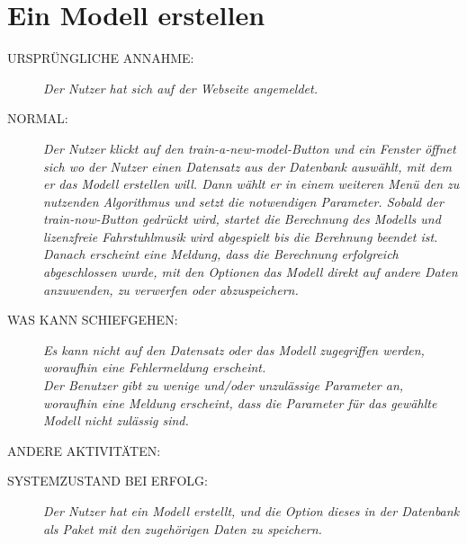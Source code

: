 \section{Ein Modell erstellen}
\begin{description}  
 \item [URSPRÜNGLICHE ANNAHME:]
    \textit{Der Nutzer hat sich auf der Webseite angemeldet.}
  \item [NORMAL:]
    \textit{Der Nutzer klickt auf den train-a-new-model-Button und ein Fenster öffnet sich wo der Nutzer einen Datensatz aus der Datenbank auswählt, mit dem er das Modell erstellen will. Dann wählt er in einem weiteren Menü den zu nutzenden Algorithmus und setzt die notwendigen Parameter. Sobald der train-now-Button gedrückt wird, startet die Berechnung des Modells und lizenzfreie Fahrstuhlmusik wird abgespielt bis die Berehnung beendet ist. Danach erscheint eine Meldung, dass die Berechnung erfolgreich abgeschlossen wurde, mit den Optionen das Modell direkt auf andere Daten anzuwenden, zu verwerfen oder abzuspeichern.}
  \item [WAS KANN SCHIEFGEHEN:]
    \textit{Es kann nicht auf den Datensatz oder das Modell zugegriffen werden, woraufhin eine Fehlermeldung erscheint.\\
Der Benutzer gibt zu wenige und/oder unzulässige Parameter an, woraufhin eine Meldung erscheint, dass die Parameter für das gewählte Modell nicht zulässig sind.
}
  \item [ANDERE AKTIVITÄTEN:]
    \textit{}
  \item [SYSTEMZUSTAND BEI ERFOLG:]
    \textit{Der Nutzer hat ein Modell erstellt, und die Option dieses in der Datenbank als Paket mit den zugehörigen Daten zu speichern.}
\end{description}

